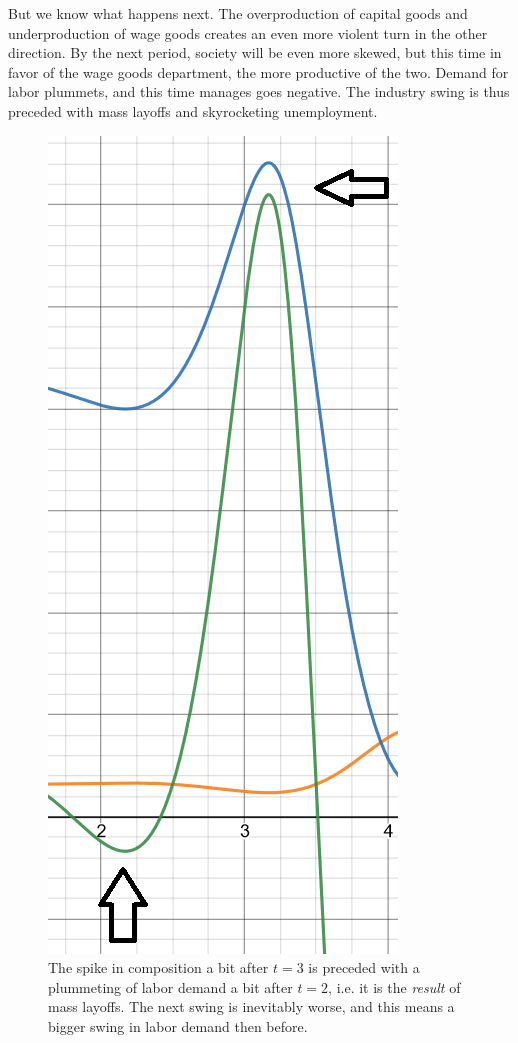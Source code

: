 \documentclass{article}
\theoremstyle{theorem}
\begin{document}
But we know what happens next. The overproduction of capital goods and underproduction of wage goods creates an even more violent turn in the other direction. By the next period, society will be even more skewed, but this time in favor of the wage goods department, the more productive of the two. Demand for labor plummets, and this time manages goes negative. The industry swing is thus preceded with mass layoffs and skyrocketing unemployment.
\begin{figure}[H]
\centering
\includegraphics[scale=.7]{Images/demandSpike2}
\caption{The spike in composition a bit after $t=3$ is preceded with a plummeting of labor demand a bit after $t=2$, i.e. it is the \emph{result} of mass layoffs. The next swing is inevitably worse, and this means a bigger swing in labor demand then before.}
\end{figure}
\end{document}
